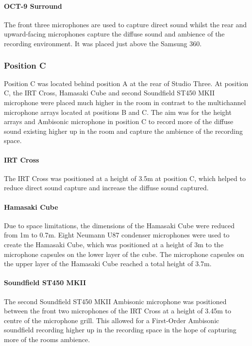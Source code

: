 			\paragraph{OCT-9 Surround}
			The front three microphones are used to capture direct sound whilst the rear and upward-facing microphones capture the diffuse sound and ambience of the recording environment. It was placed just above the Samsung 360.\\



		\subsubsection{Position C}
			Position C was located behind position A at the rear of Studio Three. At position C, the IRT Cross, Hamasaki Cube and second Soundfield ST450 MKII microphone were placed much higher in the room in contrast to the multichannel microphone arrays located at positions B and C. The aim was for the height arrays and Ambisonic microphone in position C to record more of the diffuse sound existing higher up in the room and capture the ambience of the recording space.\\

			\paragraph{IRT Cross}
			The IRT Cross was positioned at a height of 3.5m at position C, which helped to reduce direct sound capture and increase the diffuse sound captured.\\

			\paragraph{Hamasaki Cube}
			Due to space limitations, the dimensions of the Hamasaki Cube were reduced from 1m to 0.7m. Eight Neumann U87 condenser microphones were used to create the Hamasaki Cube, which was positioned at a height of 3m to the microphone capsules on the lower layer of the cube. The microphone capsules on the upper layer of the Hamasaki Cube reached a total height of 3.7m.\\

			\paragraph{Soundfield ST450 MKII}

			The second Soundfield ST450 MKII Ambisonic microphone was positioned between the front two microphones of the IRT Cross at a height of 3.45m to centre of the microphone grill. This allowed for a First-Order Ambisonic soundfield recording higher up in the recording space in the hope of capturing more of the rooms ambience. \\

